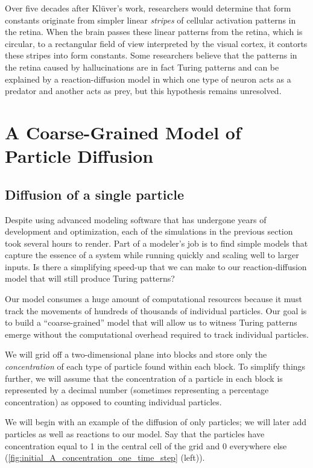 Over five decades after Klüver's work, researchers would determine that form constants originate from simpler linear \textit{stripes} of cellular activation patterns in the retina. When the brain passes these linear patterns from the retina, which is circular, to a rectangular field of view interpreted by the visual cortex, it contorts these stripes into form constants. Some researchers believe that the patterns in the retina caused by hallucinations are in fact Turing patterns and can be explained by a reaction-diffusion model in which one type of neuron acts as a predator and another acts as prey, but this hypothesis remains unresolved.\\

\FloatBarrier
{}
\section{A Coarse-Grained Model of Particle Diffusion}
\label{sec:coarse_grained_diffusion}

\subsection{Diffusion of a single particle}

Despite using advanced modeling software that has undergone years of development and optimization, each of the simulations in the previous section took several hours to render. Part of a modeler's job is to find simple models that capture the essence of a system while running quickly and scaling well to larger inputs. Is there a simplifying speed-up that we can make to our reaction-diffusion model that will still produce Turing patterns?

Our model consumes a huge amount of computational resources because it must track the movements of hundreds of thousands of individual particles. Our goal is to build a ``coarse-grained'' model that will allow us to witness Turing patterns emerge without the computational overhead required to track individual particles.

We will grid off a two-dimensional plane into blocks and store only the \textit{concentration} of each type of particle found within each block. To simplify things further, we will assume that the concentration of a particle in each block is represented by a decimal number (sometimes representing a percentage concentration) as opposed to counting individual particles.

We will begin with an example of the diffusion of only  particles; we will later add  particles as well as reactions to our model. Say that the particles have concentration equal to 1 in the central cell of the grid and 0 everywhere else (\autoref{fig:initial_A_concentration_one_time_step} (left)).\\

